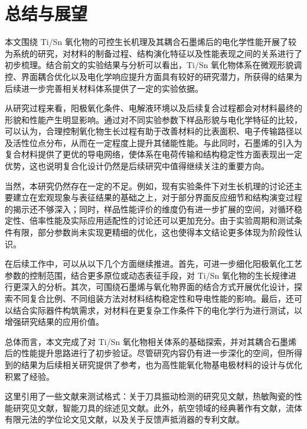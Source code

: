 \chapter{总结与展望}

本文围绕 Ti/Sn 氧化物的可控生长机理及其耦合石墨烯后的电化学性能开展了较为系统的研究，对材料的制备过程、结构演化特征以及性能表现之间的关系进行了初步梳理。结合前文的实验结果与分析可以看出，Ti/Sn 氧化物体系在微观形貌调控、界面耦合优化以及电化学响应提升方面具有较好的研究潜力，所获得的结果为后续进一步完善相关材料体系提供了一定的实验依据。

从研究过程来看，阳极氧化条件、电解液环境以及后续复合过程都会对材料最终的形貌和性能产生明显影响。通过对不同实验参数下样品形貌与电化学特征的比较，可以认为，合理控制氧化物生长过程有助于改善材料的比表面积、电子传输路径以及活性位点分布，从而在一定程度上提升其储能性能。与此同时，石墨烯的引入为复合材料提供了更优的导电网络，使体系在电荷传输和结构稳定性方面表现出一定优势，这也说明复合化设计仍然是后续研究中值得继续关注的重要方向。

当然，本研究仍然存在一定的不足。例如，现有实验条件下对生长机理的讨论还主要建立在宏观现象与表征结果的基础之上，对于部分界面反应细节和结构演变过程的揭示还不够深入；同时，样品性能评价的维度仍有进一步扩展的空间，对循环稳定性、倍率性能及实际应用适配性的讨论还可以更加充分。由于实验周期和测试条件有限，部分参数尚未实现更精细的优化，这也使得本文结论更多体现为阶段性认识。

在后续工作中，可以从以下几个方面继续推进。首先，可进一步细化阳极氧化工艺参数的控制范围，结合更多原位或动态表征手段，对 Ti/Sn 氧化物的生长规律进行更深入的分析。其次，可围绕石墨烯与氧化物界面的结合方式开展优化设计，探索不同复合比例、不同组装方法对材料结构稳定性和导电性能的影响。最后，还可以结合实际器件构筑需求，对材料在更复杂工作条件下的电化学行为进行测试，以增强研究结果的应用价值。

总体而言，本文完成了对 Ti/Sn 氧化物相关体系的基础探索，并对其耦合石墨烯后的性能提升思路进行了初步验证。尽管研究内容仍有进一步深化的空间，但所得到的结果为后续相关研究提供了参考，也为高性能氧化物基电极材料的设计与优化积累了经验。

这里引用了一些文献来测试格式：关于刀具振动检测的研究见文献\cite{devillez2007tool}，热敏陶瓷的性能研究见文献\cite{chen2021microstructure}，智能刀具的综述见文献\cite{liu2021review}。此外，航空领域的经典著作有文献\cite{liu1988strake}，流体有限元法的学位论文见文献\cite{zhu1996new}，以及关于反馈声抵消器的专利文献\cite{li1986feedback}。
